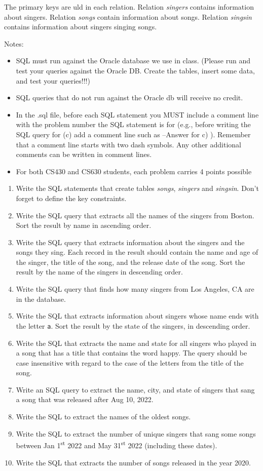 \documentclass[letterpaper, 11pt]{article}
\begin{document}
The primary keys are uld in each relation. Relation \textit{singers} contains information about singers. Relation \textit{songs} contain information about songs. Relation \textit{singsin} contains information about singers singing songs.

Notes:
\begin{itemize}
    \item SQL must run against the Oracle database we use in class. (Please run and test your queries against the Oracle DB. Create the tables, insert some data, and test your queries!!!)
    \item SQL queries that do not run against the Oracle db will receive no credit.
    \item In the .sql file, before each SQL statement you MUST include a comment line with the problem number the SQL statement is for (e.g., before writing the SQL query for (c) add a comment line such as --Answer for c) ). Remember that a comment line starts with two dash symbols. Any other additional comments can be written in comment lines.
    \item For both CS430 and CS630 students, each problem carries 4 points possible
\end{itemize}

\begin{enumerate}[label={\alph*})]
    \item Write the SQL statements that create tables \textit{songs}, \textit{singers} and \textit{singsin}. Don’t forget to define the key constraints.
    \item Write the SQL query that extracts all the names of the singers from Boston. Sort the result by name in ascending order.
    \item Write the SQL query that extracts information about the singers and the songs they sing. Each record in the result should contain the name and age of the singer, the title of the song, and the release date of the song. Sort the result by the name of the singers in descending order.
    \item Write the SQL query that finds how many singers from Los Angeles, CA are in the database.
    \item Write the SQL that extracts information about singers whose name ends with the letter \texttt{a}. Sort the result by the state of the singers, in descending order.
    \item Write the SQL that extracts the name and state for all singers who played in a song that has a title that contains the word happy. The query should be case insensitive with regard to the case of the letters from the title of the song.
    \item Write an SQL query to extract the name, city, and state of singers that sang a song that was released after Aug 10, 2022.
    \item Write the SQL to extract the names of the oldest songs.
    \item Write the SQL to extract the number of unique singers that sang some songs between Jan 1\textsuperscript{st} 2022 and May 31\textsuperscript{st} 2022 (including these dates).
    \item Write the SQL that extracts the number of songs released in the year 2020.
\end{enumerate}
\end{document}
